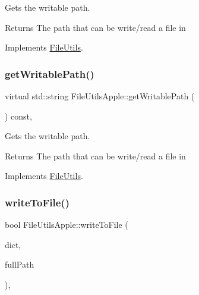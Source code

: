 Gets the writable path. \begin{DoxyReturn}{Returns}
The path that can be write/read a file in 
\end{DoxyReturn}


Implements \hyperlink{classFileUtils_aab14c8d4e292f7a1e9b2b2908d02a0ed}{File\+Utils}.

\mbox{\label{classFileUtilsApple_a595858371ceb723ab608f535f8a2c454}} 
\subsubsection{\texorpdfstring{get\+Writable\+Path()}{getWritablePath()}\hspace{0.1cm}{\footnotesize\ttfamily [2/2]}}
{\footnotesize\ttfamily virtual std\+::string File\+Utils\+Apple\+::get\+Writable\+Path (\begin{DoxyParamCaption}{ }\end{DoxyParamCaption}) const\hspace{0.3cm}{\ttfamily [override]}, {\ttfamily [virtual]}}

Gets the writable path. \begin{DoxyReturn}{Returns}
The path that can be write/read a file in 
\end{DoxyReturn}


Implements \hyperlink{classFileUtils_aab14c8d4e292f7a1e9b2b2908d02a0ed}{File\+Utils}.

\mbox{\label{classFileUtilsApple_a57fe37f168814e2f6911fff52f7626c0}} 
\subsubsection{\texorpdfstring{write\+To\+File()}{writeToFile()}\hspace{0.1cm}{\footnotesize\ttfamily [1/2]}}
{\footnotesize\ttfamily bool File\+Utils\+Apple\+::write\+To\+File (\begin{DoxyParamCaption}\item[{const Value\+Map \&}]{dict,  }\item[{const std\+::string \&}]{full\+Path }\end{DoxyParamCaption})\hspace{0.3cm}{\ttfamily [override]}, {\ttfamily [virtual]}}

